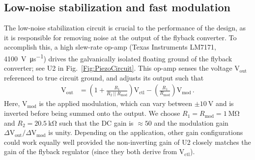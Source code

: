 \documentclass[aip,rsi,reprint]{revtex4-1} %
\begin{document}
\subsection{Low-noise stabilization and fast modulation}
\label{Sec:LowNoiseStabilization}



%
%
%

The low-noise stabilization circuit is crucial to the performance of the design, as it is responsible for removing noise at the output of the flyback converter.
To accomplish this, a high slew-rate op-amp (Texas Instruments LM7171, \SI[per-mode=symbol]{4100}{\volt\per\micro\second}) drives the galvanically isolated floating ground of the flyback converter; see U2 in Fig.~\ref{Fig:PiezoCircuit}.
This op-amp senses the voltage $\text{V}_\text{out}$ referenced to true circuit ground, and adjusts its output such that
\begin{align}
\text{V}_\text{out} &= \left(1 + \frac{R_1}{R_2~||~R_\text{mod}}\right) \text{V}_\text{ctl} -
\left(\frac{R_1}{R_\text{mod}}\right) \text{V}_\text{mod}\,.
\label{Eq:FullTransferFunc}
\end{align}
Here, $\text{V}_\text{mod}$ is the applied modulation, which can vary between $\pm\SI{10}{\volt}$ and is inverted before being summed onto the output.
We choose $R_1 = R_\text{mod} = \SI{1}{\mega\ohm}$ and $R_2 = \SI{20.5}{\kilo\ohm}$ such that the DC gain is $\approx 50$ and the modulation gain $\Delta\text{V}_\text{out}/\Delta\text{V}_\text{mod}$ is unity.
Depending on the application, other gain configurations could work equally well provided the non-inverting gain of U2 closely matches the gain of the flyback regulator (since they both derive from $\text{V}_\text{ctl}$).
\end{document}
